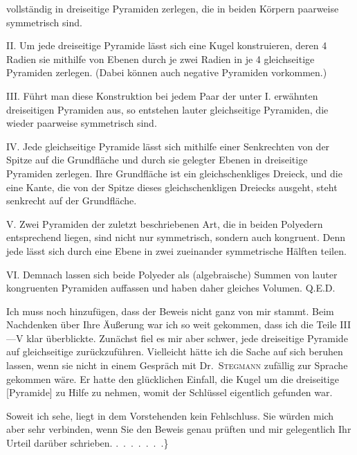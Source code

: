 %
\noindent vollständig in dreiseitige Pyramiden zerlegen, die in beiden Körpern paarweise symmetrisch sind.

II. Um jede dreiseitige Pyramide lässt sich eine Kugel konstruieren, deren 4 Radien sie mithilfe von Ebenen durch je zwei Radien in je 4 gleichseitige Pyramiden zerlegen. (Dabei können auch negative Pyramiden vorkommen.)

III. Führt man diese Konstruktion bei jedem Paar der unter I. erwähnten dreiseitigen Pyramiden aus, so entstehen lauter gleichseitige Pyramiden, die wieder paarweise symmetrisch sind.

IV. Jede gleichseitige Pyramide lässt sich mithilfe einer Senkrechten von der Spitze auf die Grundfläche und durch sie gelegter Ebenen in  dreiseitige Pyramiden zerlegen. Ihre Grundfläche ist ein gleichschenkliges Dreieck, und die eine Kante, die von der Spitze dieses gleichschenkligen Dreiecks ausgeht, steht senkrecht auf der Grundfläche.

V. Zwei Pyramiden der zuletzt beschriebenen Art, die in beiden Polyedern entsprechend liegen, sind nicht nur symmetrisch, sondern auch kongruent. Denn jede lässt sich durch eine Ebene in zwei zueinander symmetrische Hälften teilen.

VI. Demnach lassen sich beide Polyeder als (algebraische) Summen von lauter kongruenten Pyramiden auffassen und haben daher gleiches Volumen. Q.E.D.

Ich muss noch hinzufügen, dass der Beweis nicht ganz von mir stammt. Beim Nachdenken über Ihre Äußerung war ich so weit gekommen, dass ich die Teile III---V klar überblickte. Zunächst fiel es mir aber schwer, jede dreiseitige Pyramide auf gleichseitige zurückzuführen. Vielleicht hätte ich die Sache auf sich beruhen lassen, wenn sie nicht in einem Gespräch mit Dr.\ \textsc{Stegmann} zufällig zur Sprache gekommen wäre. Er hatte den glücklichen Einfall, die Kugel um die dreiseitige [Pyramide] zu Hilfe zu nehmen, womit der Schlüssel eigentlich gefunden war.

Soweit ich sehe, liegt in dem Vorstehenden kein Fehlschluss. Sie würden mich aber sehr verbinden, wenn Sie den Beweis genau prüften und mir gelegentlich Ihr Urteil darüber schrieben. \mbox{.\ .\ .\ .\ .\ .\ .}\}

